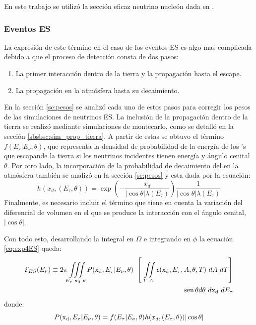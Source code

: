 	En este trabajo se utilizó la sección eficaz neutrino nucleón dada en \cite{cite:cooper_sarkar}.
	
	\subsubsection{Eventos ES}
	
	La expresión de este término en el caso de los eventos ES es algo mas complicada debido a que el proceso de detección consta de dos pasos:
	\begin{enumerate}
	 \item La primer interacción dentro de la tierra y la propagación hasta el escape.
	 \item La propagación en la atmósfera hasta su decaimiento.
	\end{enumerate}
	
	En la sección \ref{sc:pesos} se analizó cada uno de estos pasos para corregir los pesos de las simulaciones de neutrinos ES.
	La inclusión de la propagación dentro de la tierra se realizó mediante simulaciones de montecarlo, como se detalló en la sección \ref{sbsbsc:sim_prop_tierra}.
	A partir de estas se obtuvo el término $f(E_\tau|E_\nu,\theta)$, que representa la densidad de probabilidad de la energía de los \tauon{}'s que escapande la tierra si los neutrinos incidentes tienen energía \enu{} y ángulo cenital $\theta$.
	Por otro lado, la incorporación de la probabilidad de decaimiento del \tauon{} en la atmósfera también se analizó en la sección \ref{sc:pesos} y esta dada por la ecuación:
	\begin{equation}
		h(x_d,(E_\tau,\theta))=
		\exp{\left(
		-\frac{x_d}{|\cos\theta|\lambda(E_\tau)}
		\right)}
		\frac{1}{|\cos\theta|\lambda(E_\tau)}
	\end{equation}
	Finalmente, es necesario incluir el término que tiene en cuenta la variación del diferencial de volumen en el que se produce la interacción con el ángulo cenital, $|\cos\theta|$.
	
	Con todo esto, desarrollando la integral en $\Omega$ e integrando en $\phi$ la ecuación \ref{eq:exp4ES} queda:
	\begin{equation}
	\begin{aligned}
	 {\cal E}_{ES}(E_\nu)\equiv2\pi\iiint\limits_{E_\tau~{\rm x_d}~\theta}P({\rm x_d},E_\tau|E_{\nu},\theta)~
	 \left[~
	 \iint\limits_{T~A}\epsilon({\rm x_d},E_\tau,A,\theta,T)~dA~dT
	 \right]\\
	 ~\operatorname{sen}\theta d\theta~d{\rm x_d}~dE_\tau
	 \end{aligned}
	 \label{eq:exp5ES}
	\end{equation}
	donde:
	\begin{equation}
	 P({\rm x_d},E_\tau|E_{\nu},\theta)=
	 f(E_\tau|E_\nu,\theta)
	 h(x_d,(E_\tau,\theta))
	 |\cos\theta|
	\end{equation}
	
